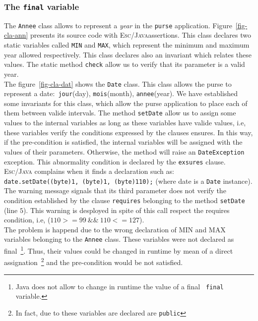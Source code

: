 \subsubsection{The {\tt \bf final} variable}
The \texttt{Annee} class allows to represent a \textit{year} in the
\texttt{purse} application. Figure~\ref{fig-cla-ann} presents its
source code with \textsc{Esc/Java}assertions. This class declares two 
static variables called \texttt{MIN} and \texttt{MAX}, which represent
the minimum and maximum year allowed respectively. This class declares 
also an invariant which relates these values. The static method
\texttt{check} allow us to verify that its parameter is a valid
year. \\

The figure~\ref{fig-cla-dat} shows the \texttt{Date} class. This class 
allows the purse to represent a date$:$ \texttt{jour}(day),
\texttt{mois}(month), \texttt{annee}(year). We have established some
invariants for this class, which allow the purse application to place
each of them between valide intervals. The method \texttt{setDate}
allow us to assign some values to the internal variables as long as
these variables have valide values, i.e, these variables verify the
conditions expressed by the clauses ensures. In this way, if the
pre-condition is satisfied, the internal variables will be assigned
with the values of their parameters. Otherwise, the method will raise
an \texttt{DateException} exception. This abnormality condition is
declared by the \texttt{exsures} clause. \\

\textsc{Esc/Java} complains when it finds a declaration such as$:$ \\
\mbox{\tt date.setDate((byte)1, (byte)1, (byte)110);} (where date is a
\texttt{Date} instance). The warning message signals that its third
parameter does not verify the condition established by the clause
\texttt{requires} belonging to the method \texttt{setDate} (line
$5$). This warning is desployed in spite of this call respect the
requires condition, i.e, ($110>=99\ \&\&\ 110<= 127 $). \\

The problem is happend due to the wrong declaration of \textsc{MIN}
and \textsc{MAX} variables belonging to the \texttt{Annee}
class. These variables were not declared as final~\footnote{{\sc
Java} does not allow to change in runtime the value of a final {\tt
final} variable.}. Thus, their values could be changed in runtime by
mean of a direct assignation~\footnote{In fact, due to these variables
are declared are \texttt{public}} and the pre-condition would be not
satisfied. \\


